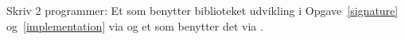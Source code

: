 Skriv 2 programmer: Et som benytter biblioteket udvikling i Opgave~\ref{signature} og~\ref{implementation} via  og et som benytter det via .
